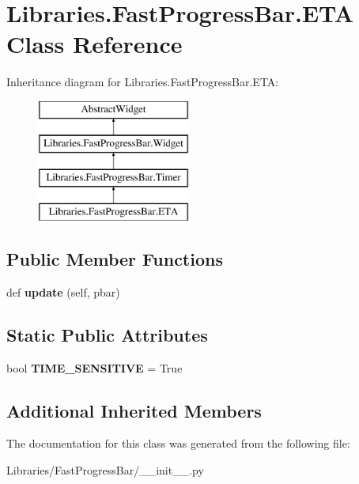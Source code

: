 \hypertarget{class_libraries_1_1_fast_progress_bar_1_1_e_t_a}{}\section{Libraries.\+Fast\+Progress\+Bar.\+E\+TA Class Reference}
\label{class_libraries_1_1_fast_progress_bar_1_1_e_t_a}
Inheritance diagram for Libraries.\+Fast\+Progress\+Bar.\+E\+TA\+:\begin{figure}[H]
\begin{center}
\leavevmode
\includegraphics[height=4.000000cm]{class_libraries_1_1_fast_progress_bar_1_1_e_t_a}
\end{center}
\end{figure}
\subsection*{Public Member Functions}
\begin{DoxyCompactItemize}
\item 
def {\bfseries update} (self, pbar)\hypertarget{class_libraries_1_1_fast_progress_bar_1_1_e_t_a_a871a8d7823bfec5a7841e586019b63a2}{}\label{class_libraries_1_1_fast_progress_bar_1_1_e_t_a_a871a8d7823bfec5a7841e586019b63a2}

\end{DoxyCompactItemize}
\subsection*{Static Public Attributes}
\begin{DoxyCompactItemize}
\item 
bool {\bfseries T\+I\+M\+E\+\_\+\+S\+E\+N\+S\+I\+T\+I\+VE} = True\hypertarget{class_libraries_1_1_fast_progress_bar_1_1_e_t_a_ad715f395b73f8ec02e5a4638a01b7d27}{}\label{class_libraries_1_1_fast_progress_bar_1_1_e_t_a_ad715f395b73f8ec02e5a4638a01b7d27}

\end{DoxyCompactItemize}
\subsection*{Additional Inherited Members}


The documentation for this class was generated from the following file\+:\begin{DoxyCompactItemize}
\item 
Libraries/\+Fast\+Progress\+Bar/\+\_\+\+\_\+init\+\_\+\+\_\+.\+py\end{DoxyCompactItemize}
